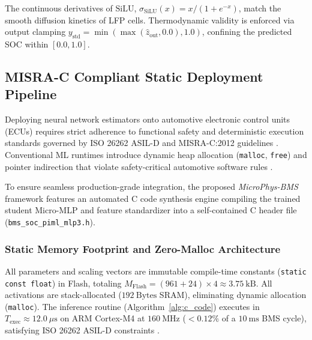 The continuous derivatives of $\text{SiLU}$, $\sigma_{\text{SiLU}}(x) = x/(1+e^{-x})$, match the smooth diffusion kinetics of LFP cells. Thermodynamic validity is enforced via output clamping $y_{\text{std}} = \min(\max(\hat{z}_{\text{out}}, 0.0), 1.0)$, confining the predicted SOC within $[0.0, 1.0]$.

\subsection{MISRA-C Compliant Static Deployment Pipeline}
\label{sec:meth_e}

Deploying neural network estimators onto automotive electronic control units (ECUs) requires strict adherence to functional safety and deterministic execution standards governed by ISO 26262 ASIL-D and MISRA-C:2012 guidelines \cite{yahyaei2023embedded}. Conventional ML runtimes introduce dynamic heap allocation (\texttt{malloc}, \texttt{free}) and pointer indirection that violate safety-critical automotive software rules \cite{yahyaei2023embedded}.

To ensure seamless production-grade integration, the proposed \textit{MicroPhys-BMS} framework features an automated C code synthesis engine compiling the trained student Micro-MLP and feature standardizer into a self-contained C header file (\texttt{bms\_soc\_piml\_mlp3.h}).

\subsubsection{Static Memory Footprint and Zero-Malloc Architecture}
All parameters and scaling vectors are immutable compile-time constants (\texttt{static const float}) in Flash, totaling $M_{\text{Flash}} = (961 + 24) \times 4 \approx 3.75\ \text{kB}$. All activations are stack-allocated ($192\ \text{Bytes}$ SRAM), eliminating dynamic allocation (\texttt{malloc}). The inference routine (Algorithm~\ref{alg:c_code}) executes in $T_{\text{exec}} \approx 12.0\ \mu\text{s}$ on ARM Cortex-M4 at $160\ \text{MHz}$ ($<0.12\%$ of a $10\ \text{ms}$ BMS cycle), satisfying ISO 26262 ASIL-D constraints \cite{yahyaei2023embedded}.


